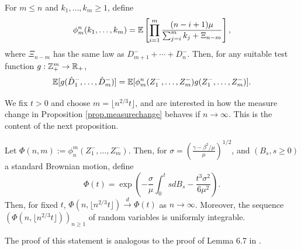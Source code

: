 \begin{proposition}\label{prop.measurechange}
For $m\leq n$ and $k_1,\dots,k_m\geq 1$, define
$$\phi_m^n(k_1,\dots,k_m)={\mathbb E}\left[\prod\limits_{i=1}^m \frac{(n-i+1)\mu}{\sum_{j=i}^m k_j + \Xi_{n-m}}\right],$$
where $\Xi_{n-m}$ has the same law as $D^-_{m+1}+\cdots+D^-_n$. Then, for any suitable test function $g:{\mathbb Z}_+^m\to {\mathbb R}_+$, 
$${\mathbb E}[g(\hat{D}^-_1,\dots, \hat{D}^-_m)]={\mathbb E}[\phi_m^n(Z_1^-,\dots,Z_m^-)g(Z_1^-,\dots,Z_m^-)].$$
\end{proposition}

We fix $t>0$ and choose $m=\lfloor n^{2/3}t\rfloor$, and are interested in how the measure change in Proposition \ref{prop.measurechange} behaves if $n\to \infty$. This is the content of the next proposition. 
\begin{proposition}\label{prop.scalingmeasurechange}
Let $\Phi(n,m):=\phi_n^m(Z^-_1,\dots,Z^-_m)$. Then, for $\sigma=\left(\frac{\gamma-\beta^2/\mu}{\mu}\right)^{1/2}$, and $(B_s,s\geq 0)$ a standard Brownian motion, define $$\Phi(t)=\exp\left(-\frac{\sigma}{\mu}\int_0^tsdB_s - \frac{t^3 \sigma^2}{6\mu^2}\right).$$
Then, for fixed $t$, $\Phi(n,\lfloor  n^{2/3} t \rfloor)\overset{d}{\to}\Phi(t)$ as $n\to \infty$. Moreover, the sequence $(\Phi(n,\lfloor  n^{2/3} t \rfloor))_{n\geq1}$ of random variables is uniformly integrable. 
\end{proposition}
The proof of this statement is analogous to the proof of Lemma 6.7 in \cite{Conchon2018}.\\

